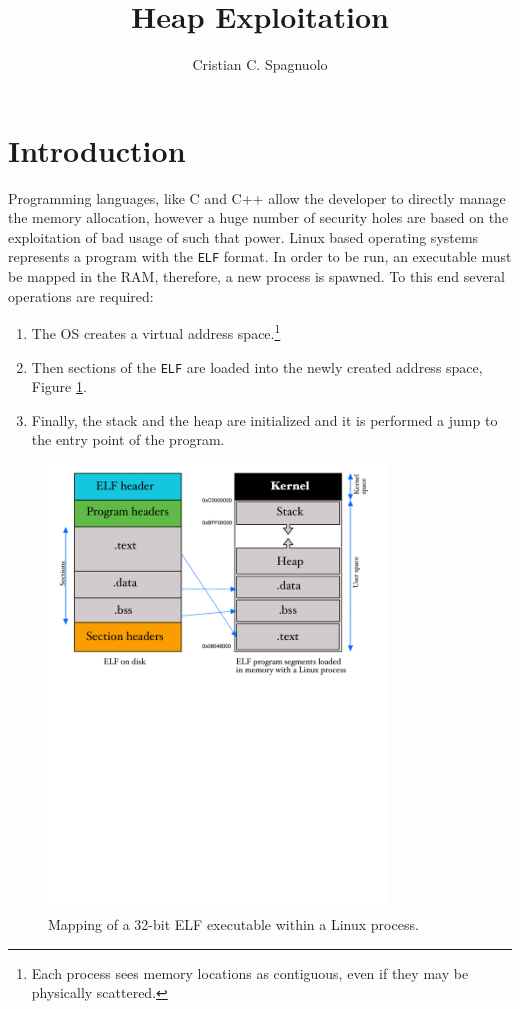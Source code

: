 \documentclass{article}
\title{{\huge Heap Exploitation}}
\author{Cristian C. Spagnuolo}
\numberwithin{equation}{subsection}
\begin{document}
\maketitle
\section{Introduction}
Programming languages, like C and C++ allow the developer to directly manage the memory allocation, however a huge number of security holes are based on the exploitation of bad usage of such that power. Linux based operating systems represents a program with the \texttt{ELF} format. In order to be run, an executable must be mapped in the RAM, therefore, a new process is spawned. To this end several operations are required:
\begin{enumerate}
    \item The OS creates a virtual address space.\footnote{Each process sees memory locations as contiguous, even if they may be physically scattered.}
    \item Then sections of the \texttt{ELF} are loaded into the newly created address space, Figure \ref{fig:elf_mapping}.
    \item Finally, the stack and the heap are initialized and it is performed a jump to the entry point of the program.
\end{enumerate}
\begin{figure}
    \centering
    \includegraphics[width=0.8\textwidth]{elf_mapping.pdf}
    \caption{Mapping of a 32-bit ELF executable within a Linux process.}
    \label{fig:elf_mapping}
\end{figure}
\end{document}
